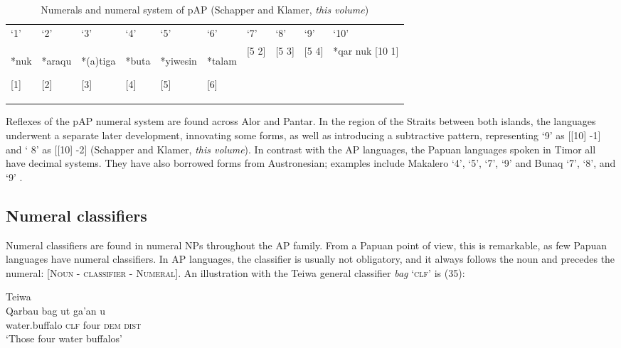 \begin{table}
\begin{tabular}{llllllllll}
`1' & `2' & `3' & `4' & `5' & `6' & `7' & `8' & `9' & `10'\\
*nuk

[1] & *araqu

[2] & *(a)tiga

[3] & *buta

[4] & *yiwesin

[5] & *talam

[6] & [5 2] & [5 3] & [5 4] & *qar nuk [10 1]\\
\end{tabular}
\caption{Numerals and numeral system of pAP (Schapper and Klamer, \textit{this volume})}
\end{table}

Reflexes of the pAP numeral system are found across Alor and Pantar.  In the region of the Straits between both islands, the languages underwent a separate later development, innovating some forms, as well as introducing a subtractive pattern, representing `9' as [[10] -1] and ` 8' as [[10] -2] (Schapper and Klamer, \textit{this volume}). In contrast with the AP languages, the Papuan languages spoken in Timor all have decimal systems. They have also borrowed forms from Austronesian; examples include Makalero `4', `5', `7', `9' \citep{Huber2011} and Bunaq `7', `8', and `9' \citep{Schapper2010}.

\subsection{Numeral classifiers}
Numeral classifiers are found in numeral NPs throughout the AP family. From a Papuan point of view, this is remarkable, as few Papuan languages have numeral classifiers. In AP languages, the classifier is usually not obligatory, and it always follows the noun and precedes the numeral: \textsc{[Noun - classifier - Numeral]. A}n illustration with the Teiwa general classifier \textit{bag} `\textsc{clf}' is (35):



\ea%
\label{ex:35}
 Teiwa \citep{Klamer2014}  \\
\gll Qarbau   bag   ut   ga'an   u \\
 water.buffalo  \textsc{clf}  four  \textsc{dem  dist}  \\
\glt `Those four water buffalos'
\z





